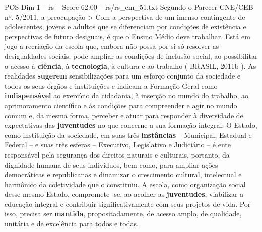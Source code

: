 \begin{textsample}{POS Dim 1 – rs – Score 62.00 – rs/rs\_em\_51.txt}
Segundo o Parecer CNE/CEB nº. 5/2011, a preocupação > Com a perspectiva de um imenso contingente de adolescentes, jovens e adultos que se diferenciam por condições de existência e perspectivas de futuro desiguais, é que o Ensino Médio deve trabalhar.
Está em jogo a recriação da escola que, embora não possa por si só resolver as desigualdades sociais, pode ampliar as condições de inclusão social, ao possibilitar o acesso à \textbf{ciência}, à \textbf{tecnologia}, à cultura e ao trabalho ( BRASIL, 2011b ).
As realidades \textbf{sugerem} sensibilizações para um esforço conjunto da sociedade e todos os seus órgãos e instituições e indicam a Formação Geral como \textbf{indispensável} ao exercício da cidadania, à inserção no mundo do trabalho, ao aprimoramento científico e às condições para compreender e agir no mundo comum e, da mesma forma, perceber e atuar para responder à diversidade de expectativas das \textbf{juventudes} no que concerne a sua formação integral.
O Estado, como instituição da sociedade, em suas três \textbf{instâncias} – Municipal, Estadual e Federal – e suas três esferas – Executivo, Legislativo e Judiciário – é ente responsável pela segurança dos direitos naturais e culturais, portanto, da dignidade humana de seus indivíduos, bem como, para ampliar ações democráticas e republicanas e dinamizar o crescimento cultural, intelectual e harmônico da coletividade que o constituiu.
A escola, como organização social desse mesmo Estado, compromete -se, ao acolher as \textbf{juventudes}, viabilizar a educação integral e contribuir significativamente com seus projetos de vida.
Por isso, precisa ser \textbf{mantida}, propositadamente, de acesso amplo, de qualidade, unitária e de excelência para todos e todas.

\end{textsample}
